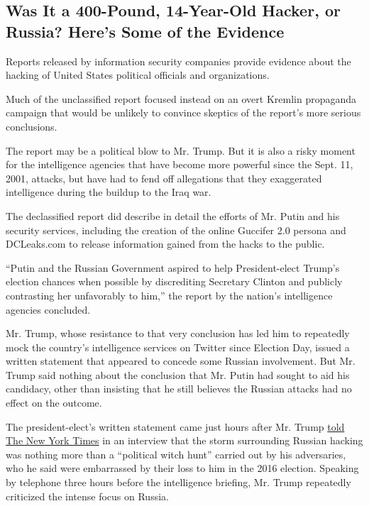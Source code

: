 \hypertarget{was-it-a-400-pound-14-year-old-hacker-or-russia-heres-some-of-the-evidence}{%
\subsection{Was It a 400-Pound, 14-Year-Old Hacker, or Russia? Here's
Some of the
Evidence}\label{was-it-a-400-pound-14-year-old-hacker-or-russia-heres-some-of-the-evidence}}

Reports released by information security companies provide evidence
about the hacking of United States political officials and
organizations.

Much of the unclassified report focused instead on an overt Kremlin
propaganda campaign that would be unlikely to convince skeptics of the
report's more serious conclusions.

The report may be a political blow to Mr. Trump. But it is also a risky
moment for the intelligence agencies that have become more powerful
since the Sept. 11, 2001, attacks, but have had to fend off allegations
that they exaggerated intelligence during the buildup to the Iraq war.

The declassified report did describe in detail the efforts of Mr. Putin
and his security services, including the creation of the online Guccifer
2.0 persona and DCLeaks.com to release information gained from the hacks
to the public.

``Putin and the Russian Government aspired to help President-elect
Trump's election chances when possible by discrediting Secretary Clinton
and publicly contrasting her unfavorably to him,'' the report by the
nation's intelligence agencies concluded.

Mr. Trump, whose resistance to that very conclusion has led him to
repeatedly mock the country's intelligence services on Twitter since
Election Day, issued a written statement that appeared to concede some
Russian involvement. But Mr. Trump said nothing about the conclusion
that Mr. Putin had sought to aid his candidacy, other than insisting
that he still believes the Russian attacks had no effect on the outcome.

The president-elect's written statement came just hours after Mr. Trump
\href{https://www.nytimes3xbfgragh.onion/2017/01/06/us/politics/donald-trump-wall-hack-russia.html}{told
The New York Times} in an interview that the storm surrounding Russian
hacking was nothing more than a ``political witch hunt'' carried out by
his adversaries, who he said were embarrassed by their loss to him in
the 2016 election. Speaking by telephone three hours before the
intelligence briefing, Mr. Trump repeatedly criticized the intense focus
on Russia.

